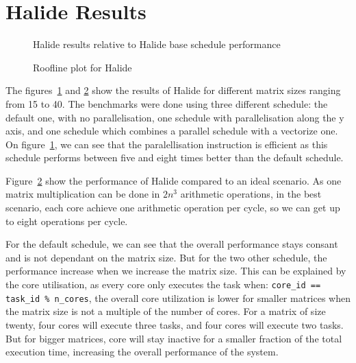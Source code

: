 \section{Halide Results}

\begin{figure}[H]
		\center
		\scalebox{.8}{}
    \caption{Halide results relative to Halide base schedule performance}
	\label{fig:barPlotHalide}
\end{figure}



\begin{figure}[H]
		\center
	\scalebox{.8}{}
    \caption{Roofline plot for Halide}
	\label{fig:rooflineHalide}
\end{figure}



	The figures~\ref{fig:barPlotHalide} and \ref{fig:rooflineHalide} show the results of Halide for different matrix sizes ranging from 15 to 40.
	The benchmarks were done using three different schedule: the default one, with no parallelisation, one schedule with parallelisation along the y axis, and one schedule which combines a parallel schedule with a vectorize one.
	On figure~\ref{fig:barPlotHalide}, we can see that the paralellisation instruction is efficient as this schedule performs between five and eight times better than the default schedule.

	Figure~\ref{fig:rooflineHalide} show the performance of Halide compared to an ideal scenario. As one matrix multiplication can be done in $2n^3$ arithmetic operations, in the best scenario, each core achieve one arithmetic operation per cycle, so we can get up to eight operations per cycle.

	For the default schedule, we can see that the overall performance stays consant and is not dependant on the matrix size. But for the two other schedule, the performance increase when we increase the matrix size. This can be explained by the core utilisation, as every core only executes the task when: \texttt{core\_id == task\_id \% n\_cores}, the overall core utilization is lower for smaller matrices when the matrix size is not a multiple of the number of cores. For a matrix of size twenty, four cores will execute three tasks, and four cores will execute two tasks.
	But for bigger matrices, core will stay inactive for a smaller fraction of the total execution time, increasing the overall performance of the  system.
 

